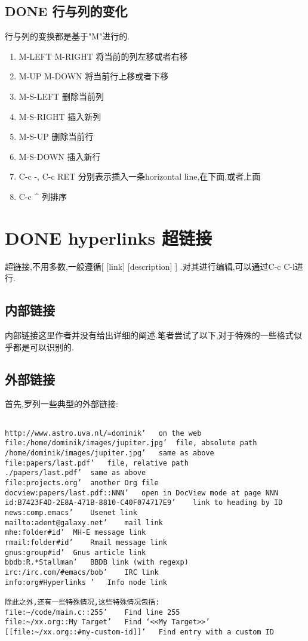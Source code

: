 \documentclass[10pt,a4paper]{article}
\begin{document}
\subsection{{\bfseries\sffamily DONE} 行与列的变化}
\label{sec:org2845e66}
行与列的变换都是基于"M"进行的.
\begin{enumerate}
\item M-LEFT M-RIGHT 将当前的列左移或者右移
\item M-UP M-DOWN 将当前行上移或者下移
\item M-S-LEFT 删除当前列
\item M-S-RIGHT 插入新列
\item M-S-UP 删除当前行
\item M-S-DOWN 插入新行
\item C-c -, C-c RET 分别表示插入一条horizontal line,在下面,或者上面
\item C-c \^{} 列排序
\end{enumerate}

\section{{\bfseries\sffamily DONE} hyperlinks 超链接}
\label{sec:org8c44e57}
超链接,不用多数,一般遵循[ [link] [description] ] .对其进行编辑,可以通过C-c C-l进行.

\subsection{内部链接}
\label{sec:org88a0308}
内部链接这里作者并没有给出详细的阐述.笔者尝试了以下,对于特殊的一些格式似乎都是可以识别的.

\subsection{外部链接}
\label{sec:org296a1d0}
首先,罗列一些典型的外部链接:

\begin{verbatim}

http://www.astro.uva.nl/=dominik’	on the web
file:/home/dominik/images/jupiter.jpg’	file, absolute path
/home/dominik/images/jupiter.jpg’	same as above
file:papers/last.pdf’	file, relative path
./papers/last.pdf’	same as above
file:projects.org’	another Org file
docview:papers/last.pdf::NNN’	open in DocView mode at page NNN
id:B7423F4D-2E8A-471B-8810-C40F074717E9’	link to heading by ID
news:comp.emacs’	Usenet link
mailto:adent@galaxy.net’	mail link
mhe:folder#id’	MH-E message link
rmail:folder#id’	Rmail message link
gnus:group#id’	Gnus article link
bbdb:R.*Stallman’	BBDB link (with regexp)
irc:/irc.com/#emacs/bob’	IRC link
info:org#Hyperlinks ’	Info node link

除此之外,还有一些特殊情况,这些特殊情况包括:
file:~/code/main.c::255’	Find line 255
file:~/xx.org::My Target’	Find ‘<<My Target>>’
[[file:~/xx.org::#my-custom-id]]’	Find entry with a custom ID

\end{verbatim}
\end{document}
